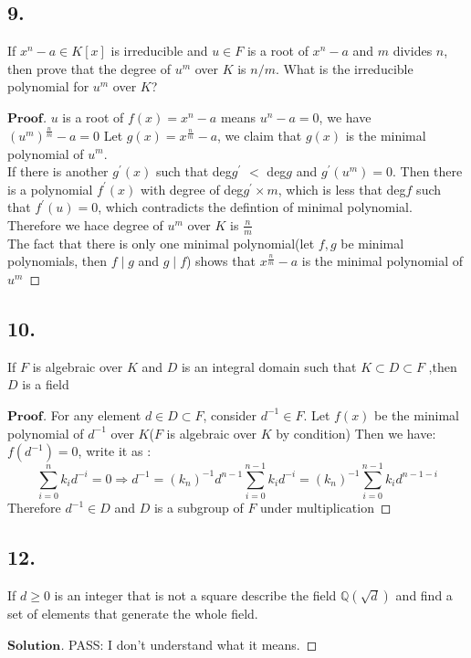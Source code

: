 \documentclass[a4paper, 11pt]{article}
\newenvironment{myprf}
{\renewcommand\qedsymbol{$ $}\begin{proof}[$\textbf{Proof}$]}
  {\end{proof}}
\newenvironment{solution}
{\renewcommand\qedsymbol{$ $}\begin{proof}[$\textbf{Solution}$]}
  {\end{proof}}
\begin{document}
\subsection*{9.}
If $x^n-a\in K[x]$ is irreducible and $u\in F$ is a root of $x^n-a$ and $m$ divides $n$,
then prove that the degree of $u^m$ over $K$ is $n/m$. What is the irreducible polynomial
for $u^m$ over $K$?
\begin{myprf}
        $u$ is a root of $f(x)=x^n-a$ means $u^n-a=0$, we have $(u^m)^{\frac{n}{m}}-a=0$
        Let $g(x)=x^{\frac{n}{m}}-a$, we claim that $g(x)$ is the minimal polynomial
        of $u^m$. \\
        \indent If there is another $g^{'}(x)$ such that deg$g^{'}$ $<$ deg$g$ and $g^{'}(u^m)=0$.
        Then there is a polynomial $f^{'}(x)$ with degree of deg$g^{'}\times m$, which
        is less that deg$f$
        such that $f^{'}(u)=0$, which contradicts the defintion of minimal polynomial.
        Therefore we hace degree of $u^m$ over $K$ is $\frac{n}{m}$\\
        \indent The fact that there is only one minimal polynomial(let $f,g$ be minimal
        polynomials, then $f\mid g$ and $g\mid f$) shows that $x^{\frac{n}{m}}-a$ is the 
        minimal polynomial of $u^m$

 \end{myprf}
 
 \subsection*{10.}
 If $F$ is algebraic over $K$ and $D$ is an integral domain such that $K\subset D\subset F$
 ,then $D$ is a field

 \begin{myprf}
         For any element $d\in D\subset F$, consider $d^{-1} \in F$. Let $f(x)$ be the 
         minimal polynomial of $d^{-1}$ over $K$($F$ is algebraic over $K$ by condition)
         Then we have: $f(d^{-1})=0$, write it as :
         $$
         \sum_{i=0}^n k_i d^{-i} = 0\Rightarrow d^{-1}=(k_n)^{-1}d^{n-1}\sum_{i=0}^{n-1}
         k_i d^{-i} = (k_n)^{-1}\sum_{i=0}^{n-1}k_id^{n-1-i}
         $$ Therefore $d^{-1}\in D$ and $D$ is a subgroup of $F$ under multiplication
    
 \end{myprf}

 \subsection*{12.}
 If $d\ge 0$ is an integer that is not a square describe the field $\mathbb{Q}(\sqrt{d})$
 and find a set of elements that generate the whole field.
 \begin{solution}
         
         PASS: I don't understand what it means.
 \end{solution}
 
\end{document}

